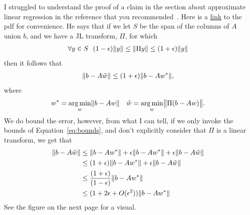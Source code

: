 

% 




% 
I struggled to understand the proof of a claim in the section about approximate linear regression
in the reference that you recommended~\cite[page 31]{DBLP:journals/corr/Woodruff14}.
Here is a \href{https://arxiv.org/pdf/1411.4357.pdf}{link} to the pdf for convenience.
He says that if we let $S$ be the span of the columns of $A$ union $b$,
and we have a JL transform, $\Pi$, for which
\begin{align}
\label{eq:bounds}
    \forall y \in S ~~ (1-\epsilon)\norm{y} \leq \norm{\Pi y} \leq (1+\epsilon)\norm{y} 
\end{align}
then it follows that 
\begin{align}
    \norm{b - A\tilde{w}} \leq (1 + \epsilon) \norm{b - Aw^*},
\end{align}
where 
\begin{align}
    w^* = \argmin_w \norm{b - Aw} & & \tilde{w} = \argmin_w \norm{\Pi(b - Aw)}.
\end{align}
We do bound the error, however, from what I can tell, 
if we only invoke the bounds of Equation~\ref{eq:bounds},
and don't explicitly consider that $\Pi$ is a linear transform, 
we get that
\begin{align*}
    \norm{b - A\tilde{w}} 
        &\leq \norm{b - Aw^*} + \epsilon \norm{b - Aw^*} + \epsilon \norm{b - A\tilde{w}} \\
        &\leq (1 + \epsilon) \norm{b - Aw^*} + \epsilon \norm{b - A\tilde{w}} \\ 
        &\leq \frac{(1 + \epsilon)}{(1 - \epsilon)} \norm{b - Aw^*} \\
        &\leq (1 + 2\epsilon + O(\epsilon^2))\norm{b - Aw^*}
\end{align*}
See the figure on the next page for a visual.
